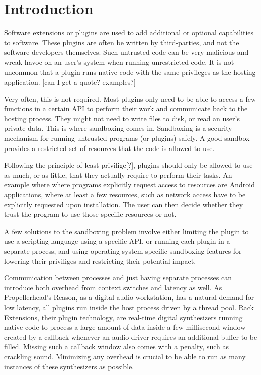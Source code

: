 \chapter {Introduction}

Software extensions or plugins are used to add additional or optional
capabilities to software. These plugins are often be written by third-parties,
and not the software developers themselves. Such untrusted code can be very
malicious and wreak havoc on an user's system when running unrestricted code. It
is not uncommon that a plugin runs native code with the same privileges as the
hosting application. [can I get a quote? examples?]

Very often, this is not required. Most plugins only need to be able to access
a few functions in a certain API to perform their work and communicate back to
the hosting process. They might not need to write files to disk, or read an
user's private data. This is where sandboxing comes in. Sandboxing is a security
mechanism for running untrusted programs (or plugins) safely. A good sandbox
provides a restricted set of resources that the code is allowed to use.

Following the principle of least privilige[?], plugins should only be allowed to
use as much, or as little, that they actually require to perform their tasks.
An example where where programs explicitly request access to resources are
Android applications, where at least a few resources, such as network access
have to be explicitly requested upon installation. The user can then decide
whether they trust the program to use those specific resources or not.

A few solutions to the sandboxing problem involve either limiting the plugin to
use a scripting language using a specific API, or running each plugin in a
separate process, and using operating-system specific sandboxing features for
lowering their priviliges and restricting their potential impact.

Communication between processes and just having separate processes can introduce
both overhead from context switches and latency as well. As Propellerhead's
Reason, as a digital audio workstation, has a natural demand for low latency,
all plugins run inside the host process driven by a thread pool. Rack
Extensions, their plugin technology, are real-time digital synthesizers running
native code to process a large amount of data inside a few-millisecond window
created by a callback whenever an audio driver requires an additional buffer to
be filled. Missing such a callback window also comes with a penalty, such as
crackling sound. Minimizing any overhead is crucial to be able to run as many
instances of these synthesizers as possible.

